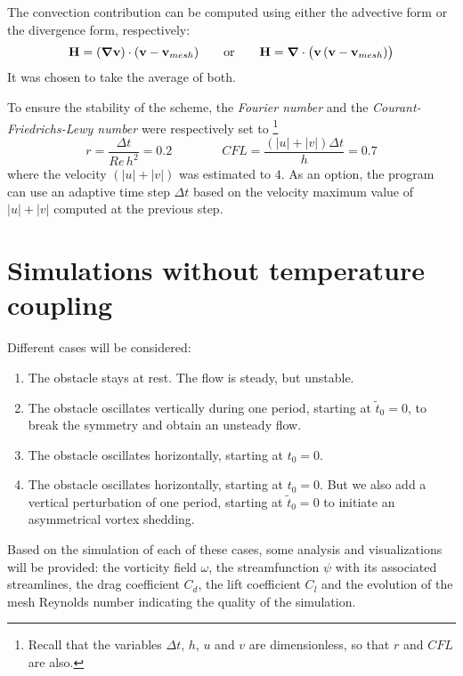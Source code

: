 \documentclass[11 pt]{article}
\begin{document}
The convection contribution can be computed using either the advective form or the divergence form, respectively:
\begin{equation}
    \mathbf{H} = (\boldsymbol\nabla \mathbf{v}) \cdot (\mathbf{v} - \mathbf{v}_{mesh}) \qquad \text{or} \qquad \mathbf{H} = \boldsymbol\nabla \cdot \big(\mathbf{v} \, (\mathbf{v} - \mathbf{v}_{mesh}) \big)
\end{equation}
It was chosen to take the average of both.

To ensure the stability of the scheme, the \textit{Fourier number} and the \textit{Courant-Friedrichs-Lewy number} were respectively set to \footnote{Recall that the variables $\Delta t$, $h$, $u$ and $v$ are dimensionless, so that $r$ and $CFL$ are also.}
\begin{equation}
    r = \frac{\Delta t}{Re \, h^2} = 0.2 \qquad\qquad CFL = \frac{(|u|+|v|) \Delta t}{h} = 0.7
\end{equation}
where the velocity $(|u|+|v|)$ was estimated to $4$. As an option, the program can use an adaptive time step $\Delta t$ based on the velocity maximum value of $|u|+|v|$ computed at the previous step.


\section{Simulations without temperature coupling}
Different cases will be considered:
\begin{enumerate}[topsep=0pt]
    \setlength\itemsep{0pt}
    \item The obstacle stays at rest. The flow is steady, but unstable.
    \item The obstacle oscillates vertically during one period, starting at $\tilde t_0 = 0$, to break the symmetry and obtain an unsteady flow.
    \item The obstacle oscillates horizontally, starting at $t_0=0$.
    \item The obstacle oscillates horizontally, starting at $t_0=0$. But we also add a vertical perturbation of one period, starting at $\tilde t_0=0$ to initiate an asymmetrical vortex shedding.
\end{enumerate}

Based on the simulation of each of these cases, some analysis and visualizations will be provided: the vorticity field $\omega$, the streamfunction $\psi$ with its associated streamlines, the drag coefficient $C_d$, the lift coefficient $C_l$ and the evolution of the mesh Reynolds number indicating the quality of the simulation.
\end{document}
